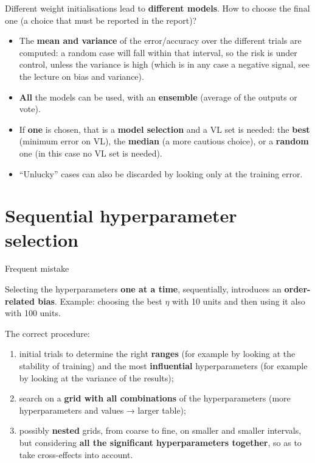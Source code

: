 Different weight initialisations lead to \textbf{different models}. How
to choose the final one (a choice that must be reported in the
report)?

\begin{itemize}
\tightlist
\item
  The \textbf{mean and variance} of the error/accuracy over the
  different trials are computed: a random case will fall within that
  interval, so the risk is under control, unless the variance is high
  (which is in any case a negative signal, see the lecture on bias and
  variance).
\item
  \textbf{All} the models can be used, with an \textbf{ensemble}
  (average of the outputs or vote).
\item
  If \textbf{one} is chosen, that is a \textbf{model selection} and a
  VL set is needed: the \textbf{best} (minimum error on VL), the
  \textbf{median} (a more cautious choice), or a \textbf{random} one (in
  this case no VL set is needed).
\item
  ``Unlucky'' cases can also be discarded by looking only at the
  training error.
\end{itemize}

\section{Sequential hyperparameter
selection}\label{selezione-sequenziale-degli-iperparametri}

\begin{boxwarning}{Frequent mistake}

Selecting the hyperparameters \textbf{one at a time}, sequentially,
introduces an \textbf{order-related bias}. Example: choosing the best
\(\eta\) with 10 units and then using it also with 100 units.

\end{boxwarning}

The correct procedure:

\begin{enumerate}
\def\labelenumi{\arabic{enumi}.}
\tightlist
\item
  initial trials to determine the right \textbf{ranges} (for example by
  looking at the stability of training) and the most
  \textbf{influential} hyperparameters (for example by looking at the
  variance of the results);
\item
  search on a \textbf{grid with all combinations} of the
  hyperparameters (more hyperparameters and values → larger table);
\item
  possibly \textbf{nested} grids, from coarse to fine, on smaller and
  smaller intervals, but considering \textbf{all the significant
  hyperparameters together}, so as to take cross-effects into account.
\end{enumerate}

